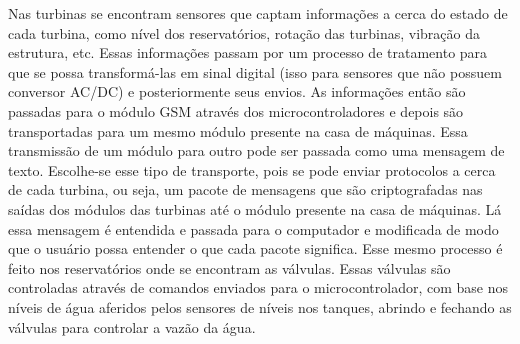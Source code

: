 Nas turbinas se encontram sensores que captam informações a cerca do estado de cada turbina, como nível dos reservatórios, rotação das turbinas, vibração da estrutura, etc. Essas informações passam por um processo de tratamento para que se possa transformá-las em sinal digital (isso para sensores que não possuem conversor AC/DC) e posteriormente seus envios. As informações então são passadas para o módulo GSM através dos microcontroladores e depois são transportadas para um mesmo módulo presente na casa de máquinas. Essa transmissão de um módulo para outro pode ser passada como uma mensagem de texto. Escolhe-se esse tipo de transporte, pois se pode enviar protocolos a cerca de cada turbina, ou seja, um pacote de mensagens que são criptografadas nas saídas dos módulos das turbinas até o módulo presente na casa de máquinas. Lá essa mensagem é entendida e passada para o computador e modificada de modo que o usuário possa entender o que cada pacote significa. Esse mesmo processo é feito nos reservatórios onde se encontram as válvulas. Essas válvulas são controladas através de comandos enviados para o microcontrolador, com base nos níveis de água aferidos pelos sensores de níveis nos tanques, abrindo e fechando as válvulas para controlar a vazão da água. 